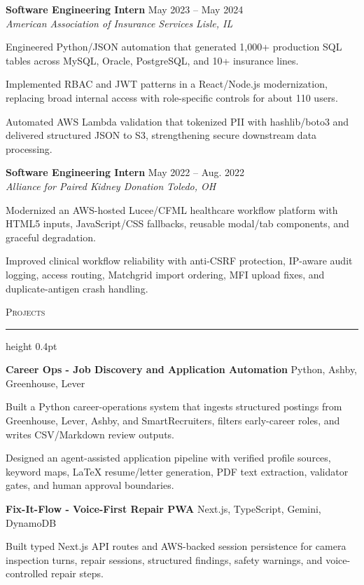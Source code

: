 \documentclass[letterpaper,11pt]{article}
\newcommand{\resumesection}[1]{%
  \par\vspace{2pt}%
  {\large\scshape #1}\par\vspace{2pt}%
  \hrule height 0.4pt\vspace{2pt}%
}
\newcommand{\resumeSubheading}[4]{
  \textbf{#1} \hfill #2\\
  \textit{#3} \hfill \textit{#4}
}
\newcommand{\projectHeading}[2]{
  \textbf{#1} \hfill #2
}
\begin{document}
\resumeSubheading
{Software Engineering Intern}{May 2023 -- May 2024}
{American Association of Insurance Services}{Lisle, IL}
\begin{tightitemize}
  \item Engineered Python/JSON automation that generated 1,000+ production SQL tables across MySQL, Oracle, PostgreSQL, and 10+ insurance lines.
  \item Implemented RBAC and JWT patterns in a React/Node.js modernization, replacing broad internal access with role-specific controls for about 110 users.
  \item Automated AWS Lambda validation that tokenized PII with hashlib/boto3 and delivered structured JSON to S3, strengthening secure downstream data processing.
\end{tightitemize}

\resumeSubheading
{Software Engineering Intern}{May 2022 -- Aug. 2022}
{Alliance for Paired Kidney Donation}{Toledo, OH}
\begin{tightitemize}
  \item Modernized an AWS-hosted Lucee/CFML healthcare workflow platform with HTML5 inputs, JavaScript/CSS fallbacks, reusable modal/tab components, and graceful degradation.
  \item Improved clinical workflow reliability with anti-CSRF protection, IP-aware audit logging, access routing, Matchgrid import ordering, MFI upload fixes, and duplicate-antigen crash handling.
\end{tightitemize}

\resumesection{Projects}
\projectHeading{Career Ops - Job Discovery and Application Automation}{Python, Ashby, Greenhouse, Lever}
\begin{tightitemize}
  \item Built a Python career-operations system that ingests structured postings from Greenhouse, Lever, Ashby, and SmartRecruiters, filters early-career roles, and writes CSV/Markdown review outputs.
  \item Designed an agent-assisted application pipeline with verified profile sources, keyword maps, LaTeX resume/letter generation, PDF text extraction, validator gates, and human approval boundaries.
\end{tightitemize}

\projectHeading{Fix-It-Flow - Voice-First Repair PWA}{Next.js, TypeScript, Gemini, DynamoDB}
\begin{tightitemize}
  \item Built typed Next.js API routes and AWS-backed session persistence for camera inspection turns, repair sessions, structured findings, safety warnings, and voice-controlled repair steps.
\end{tightitemize}
\end{document}
